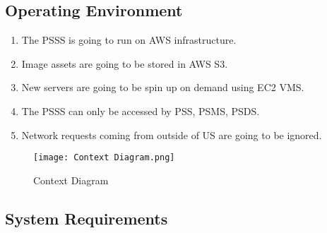 \subsection{Operating Environment}
\begin{enumerate}[label=OE-\arabic*]
    \item The PSSS is going to run on AWS infrastructure.
    \item Image assets are going to be stored in AWS S3.
    \item New servers are going to be spin up on demand using EC2 VMS.
    \item The PSSS can only be accessed by PSS, PSMS, PSDS.
    \item Network requests coming from outside of US are going to be ignored.
\end{enumerate}
\begin{figure}[!htb]
    \centering
    \texttt{[image: Context Diagram.png]}
    \caption{Context Diagram}
\end{figure}
\pagebreak
\subsection{System Requirements}
